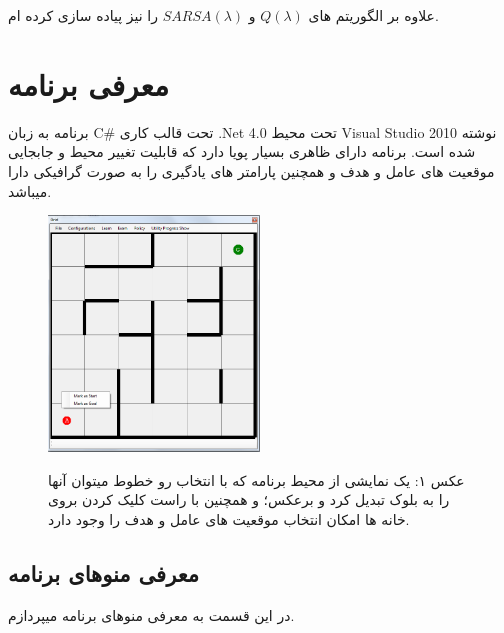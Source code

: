 \documentclass[10pt,a4paper]{article}
\begin{document}
\begin{Arabic}
علاوه بر الگوریتم های
\textenglish{$Q(\lambda)$} و \textenglish{$SARSA(\lambda)$}
را نیز پیاده سازی کرده ام.
\section{\textarabic{معرفی برنامه}}
برنامه به زبان
\textenglish{C\#}
تحت قالب کاری
\textenglish{.Net 4.0}
تحت محیط
\textenglish{Visual Studio 2010}
نوشته شده است.
  برنامه دارای ظاهری بسیار پویا دارد که قابلیت تغییر محیط و جابجایی موقعیت های عامل و هدف و همچنین پارامتر 
  های یادگیری را به صورت گرافیکی دارا میباشد.
\begin{figure}[H]
    \centering
    \includegraphics[width=0.5\textwidth]{init}
    \begin{center}\textarabic{
    عکس ۱: یک نمایشی از محیط برنامه که با انتخاب رو خطوط میتوان آنها را به بلوک تبدیل کرد و برعکس؛ و همچنین با راست کلیک کردن بروی خانه ها امکان انتخاب موقعیت های عامل و هدف را وجود دارد.}
    \end{center}
\end{figure}
    \subsection{\textarabic{معرفی منوهای برنامه}}
    در این قسمت به معرفی منوهای برنامه میپردازم.

\end{Arabic}
\end{document}
